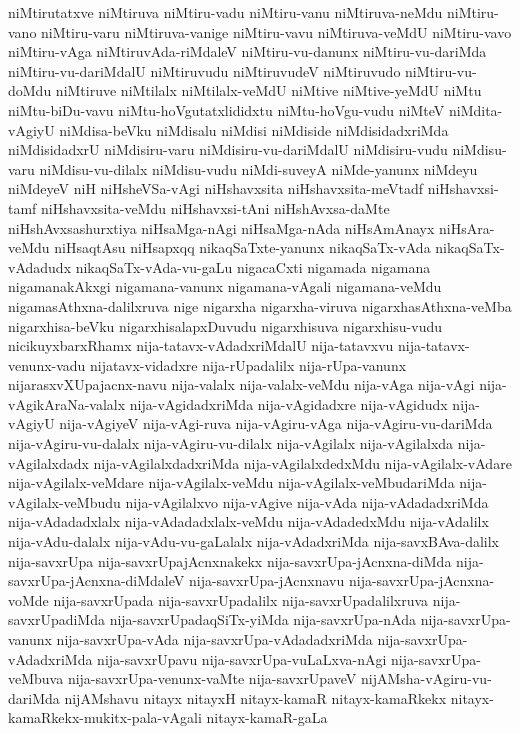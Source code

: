 {niMtirutatxve
niMtiruva
niMtiru-vadu
niMtiru-vanu
niMtiruva-neMdu
niMtiru-vano
niMtiru-varu
niMtiruva-vanige
niMtiru-vavu
niMtiruva-veMdU
niMtiru-vavo
niMtiru-vAga
niMtiruvAda-riMdaleV
niMtiru-vu-danunx
niMtiru-vu-dariMda
niMtiru-vu-dariMdalU
niMtiruvudu
niMtiruvudeV
niMtiruvudo
niMtiru-vu-doMdu
niMtiruve
niMtilalx
niMtilalx-veMdU
niMtive
niMtive-yeMdU
niMtu
niMtu-biDu-vavu
niMtu-hoVgutatxlididxtu
niMtu-hoVgu-vudu
niMteV
niMdita-vAgiyU
niMdisa-beVku
niMdisalu
niMdisi
niMdiside
niMdisidadxriMda
niMdisidadxrU
niMdisiru-varu
niMdisiru-vu-dariMdalU
niMdisiru-vudu
niMdisu-varu
niMdisu-vu-dilalx
niMdisu-vudu
niMdi-suveyA
niMde-yanunx
niMdeyu
niMdeyeV
niH
niHsheVSa-vAgi
niHshavxsita
niHshavxsita-meVtadf
niHshavxsi-tamf
niHshavxsita-veMdu
niHshavxsi-tAni
niHshAvxsa-daMte
niHshAvxsashurxtiya
niHsaMga-nAgi
niHsaMga-nAda
niHsAmAnayx
niHsAra-veMdu
niHsaqtAsu
niHsapxqq
nikaqSaTxte-yanunx
nikaqSaTx-vAda
nikaqSaTx-vAdadudx
nikaqSaTx-vAda-vu-gaLu
nigacaCxti
nigamada
nigamana
nigamanakAkxgi
nigamana-vanunx
nigamana-vAgali
nigamana-veMdu
nigamasAthxna-dalilxruva
nige
nigarxha
nigarxha-viruva
nigarxhasAthxna-veMba
nigarxhisa-beVku
nigarxhisalapxDuvudu
nigarxhisuva
nigarxhisu-vudu
nicikuyxbarxRhamx
nija-tatavx-vAdadxriMdalU
nija-tatavxvu
nija-tatavx-venunx-vadu
nijatavx-vidadxre
nija-rUpadalilx
nija-rUpa-vanunx
nijarasxvXUpajacnx-navu
nija-valalx
nija-valalx-veMdu
nija-vAga
nija-vAgi
nija-vAgikAraNa-valalx
nija-vAgidadxriMda
nija-vAgidadxre
nija-vAgidudx
nija-vAgiyU
nija-vAgiyeV
nija-vAgi-ruva
nija-vAgiru-vAga
nija-vAgiru-vu-dariMda
nija-vAgiru-vu-dalalx
nija-vAgiru-vu-dilalx
nija-vAgilalx
nija-vAgilalxda
nija-vAgilalxdadx
nija-vAgilalxdadxriMda
nija-vAgilalxdedxMdu
nija-vAgilalx-vAdare
nija-vAgilalx-veMdare
nija-vAgilalx-veMdu
nija-vAgilalx-veMbudariMda
nija-vAgilalx-veMbudu
nija-vAgilalxvo
nija-vAgive
nija-vAda
nija-vAdadadxriMda
nija-vAdadadxlalx
nija-vAdadadxlalx-veMdu
nija-vAdadedxMdu
nija-vAdalilx
nija-vAdu-dalalx
nija-vAdu-vu-gaLalalx
nija-vAdadxriMda
nija-savxBAva-dalilx
nija-savxrUpa
nija-savxrUpajAcnxnakekx
nija-savxrUpa-jAcnxna-diMda
nija-savxrUpa-jAcnxna-diMdaleV
nija-savxrUpa-jAcnxnavu
nija-savxrUpa-jAcnxna-voMde
nija-savxrUpada
nija-savxrUpadalilx
nija-savxrUpadalilxruva
nija-savxrUpadiMda
nija-savxrUpadaqSiTx-yiMda
nija-savxrUpa-nAda
nija-savxrUpa-vanunx
nija-savxrUpa-vAda
nija-savxrUpa-vAdadadxriMda
nija-savxrUpa-vAdadxriMda
nija-savxrUpavu
nija-savxrUpa-vuLaLxva-nAgi
nija-savxrUpa-veMbuva
nija-savxrUpa-venunx-vaMte
nija-savxrUpaveV
nijAMsha-vAgiru-vu-dariMda
nijAMshavu
nitayx
nitayxH
nitayx-kamaR
nitayx-kamaRkekx
nitayx-kamaRkekx-mukitx-pala-vAgali
nitayx-kamaR-gaLa
}
